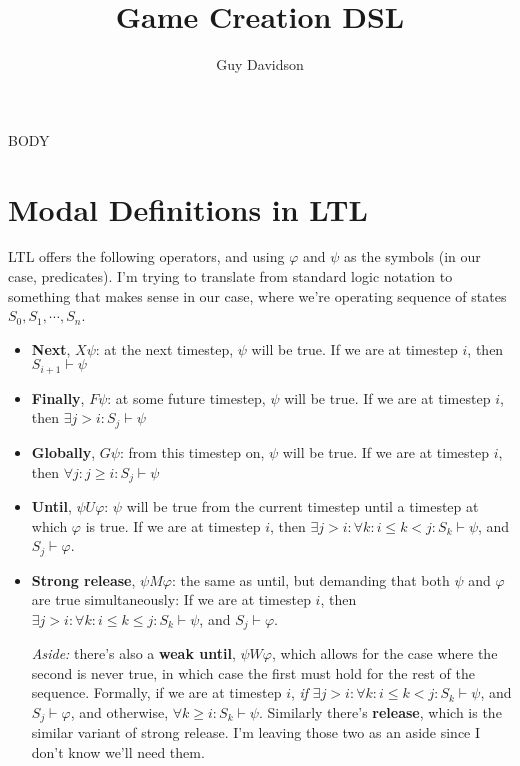 \documentclass{article}
\title{Game Creation DSL}
\author{Guy Davidson}
\begin{document}
\maketitle

{{BODY}}

\section{Modal Definitions in LTL}
LTL offers the following operators, and using $\varphi$ and $\psi$ as the symbols (in our case, predicates). 
I'm trying to translate from standard logic notation to something that makes sense in our case, where we're operating sequence of states $S_0, S_1, \cdots, S_n$. 
\begin{itemize}
    \item \textbf{Next}, $X \psi$: at the next timestep, $\psi$ will be true. If we are at timestep $i$, then $S_{i+1} \vdash \psi$
    
    \item \textbf{Finally}, $F \psi$: at some future timestep, $\psi$ will be true. If we are at timestep $i$, then $\exists j > i:  S_{j} \vdash \psi$
    
    \item \textbf{Globally}, $G \psi$: from this timestep on, $\psi$ will be true. If we are at timestep $i$, then $\forall j: j \geq i: S_{j} \vdash \psi$
    
    \item \textbf{Until}, $\psi U \varphi$: $\psi$ will be true from the current timestep until a timestep at which $\varphi$ is true. If we are at timestep $i$, then $\exists j > i: \forall k: i \leq k < j: S_k \vdash \psi$, and $S_j \vdash \varphi$.
    \item \textbf{Strong release}, $\psi M \varphi$: the same as until, but demanding that both $\psi$ and $\varphi$ are true simultaneously: If we are at timestep $i$, then $\exists j > i: \forall k: i \leq k \leq j: S_k \vdash \psi$, and $S_j \vdash \varphi$. 
    
    \textit{Aside:} there's also a \textbf{weak until}, $\psi W \varphi$, which allows for the case where the second is never true, in which case the first must hold for the rest of the sequence. Formally, if we are at timestep $i$, \textit{if} $\exists j > i: \forall k: i \leq k < j: S_k \vdash \psi$, and $S_j \vdash \varphi$, and otherwise, $\forall k \geq i: S_k \vdash \psi$. Similarly there's \textbf{release}, which is the similar variant of strong release. I'm leaving those two as an aside since I don't know we'll need them. 
    
\end{itemize}
\end{document}
